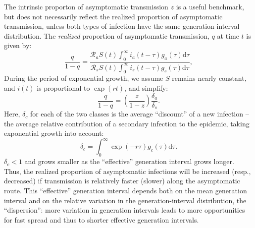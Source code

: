 The intrinsic proporton of asymptomatic transmission $z$ is a useful benchmark, but does not necessarily reflect the realized proportion of asymptomatic transmission, unless both types of infection have the same generation-interval distribution.
The \emph{realized} proportion of asymptomatic transmission, $q$ at time $t$ is given by:
\begin{equation}
\frac{q}{1-q}=\frac{\mathcal R_a S(t) \int_0^\infty i_a(t-\tau) g_a(\tau) \mathrm{d}\tau}{\mathcal R_s S(t) \int_0^\infty i_s(t-\tau) g_s(\tau) \mathrm{d}\tau},
\end{equation}
During the period of exponential growth, we assume $S$ remains nearly constant, and $i(t)$ is proportional to $\exp(r t)$, and simplify: 
\begin{equation}
\frac{q}{1-q}=\left(\frac{z}{1-z}\right)\frac{\delta_a}{\delta_s}.
\label{eq.qratio}
\end{equation}
Here, $\delta_c$ for each of the two classes is the average ``discount'' of a new infection -- the average relative contribution of a secondary infection to the epidemic, taking exponential growth into account:
\begin{equation}
	\delta_c = \int_0^\infty \exp(-r\tau) g_c(\tau) \mathrm{d}\tau.
\end{equation}
$\delta_c<1$ and grows smaller as the ``effective'' generation interval grows longer.
Thus, the realized proportion of asymptomatic infections will be increased (resp., decreased) if transmission is relatively faster (slower) along the asymptomatic route.
This ``effective'' generation interval depends both on the mean generation interval and on the relative variation in the generation-interval distribution, the ``dispersion'': more variation in generation intervals leads to more opportunities for fast spread and thus to shorter effective generation intervals.

